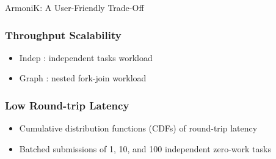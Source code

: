 \documentclass[10pt,aspectratio=1609]{beamer}
\begin{document}
\begin{section}{ArmoniK: A User-Friendly Trade-Off}
 \begin{frame}
   \frametitle{Throughput Scalability}
   \begin{itemize}
     \item Indep : independent tasks workload
     \item Graph : nested fork-join workload
   \end{itemize}
   \begin{center}
     
   \end{center}
 \end{frame}

 \begin{frame}
   \frametitle{Low Round-trip Latency}
   \begin{itemize}
     \item Cumulative distribution functions (CDFs) of round-trip latency
     \item Batched submissions of 1, 10, and 100 independent zero-work tasks
   \end{itemize}
   \begin{center}
     
   \end{center}
 \end{frame}

\end{section}
\end{document}

